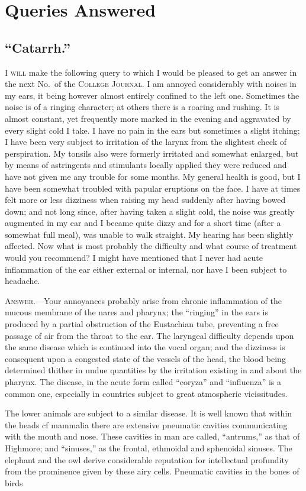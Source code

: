 \chapter*{Queries Answered}

\section*{``Catarrh.''}

\lettrine[lines=1]{}{I will} make the following query to which I would be pleased to get
an answer in the next No.\ of the \textsc{College Journal}. I am annoyed considerably
with noises in my ears, it being however almost entirely confined
to the left one. Sometimes the noise is of a ringing character; at others
there is a roaring and rushing. It is almost constant, yet frequently
more marked in the evening and aggravated by every slight cold I take.
I have no pain in the ears but sometimes a slight itching; I have been
very subject to irritation of the larynx from the slightest check of perspiration.
My tonsils also were formerly irritated and somewhat enlarged,
but by means of astringents and stimulants locally applied they
were reduced and have not given me any trouble for some months. My
general health is good, but I have been somewhat troubled with papular
eruptions on the face. I have at times felt more or less dizziness when
raising my head suddenly after having bowed down; and not long since,
after having taken a slight cold, the noise was greatly augmented in my
ear and I became quite dizzy and for a short time (after a somewhat full
meal), was unable to walk straight. My hearing has been slightly affected.
Now what is most probably the difficulty and what course of treatment
would you recommend? I might have mentioned that I never had acute
inflammation of the ear either external or internal, nor have I been subject
to headache.

\textsc{Answer.}---Your annoyances probably arise from chronic inflammation
of the mucous membrane of the nares and pharynx; the ``ringing'' in the
ears is produced by a partial obstruction of the Eustachian tube, preventing
a free passage of air from the throat to the ear. The laryngeal difficulty
depends upon the same disease which is continued into the vocal
organ; and the dizziness is consequent upon a congested state of the vessels
of the head, the blood being determined thither in undue quantities
by the irritation existing in and about the pharynx. The disease, in the
acute form called ``coryza'' and ``influenza'' is a common one, especially
in countries subject to great atmospheric vicissitudes.

The lower animals are subject to a similar disease. It is well known
that within the heads cf mammalia there are extensive pneumatic cavities
communicating with the mouth and nose. These cavities in man
are called, ``antrums,'' as that of Highmore; and ``sinuses,'' as the frontal,
ethmoidal and sphenoidal sinuses. The elephant and the owl derive
considerable reputation for intellectual profundity from the prominence
given by these airy cells. Pneumatic cavities in the bones of birds\endinput
